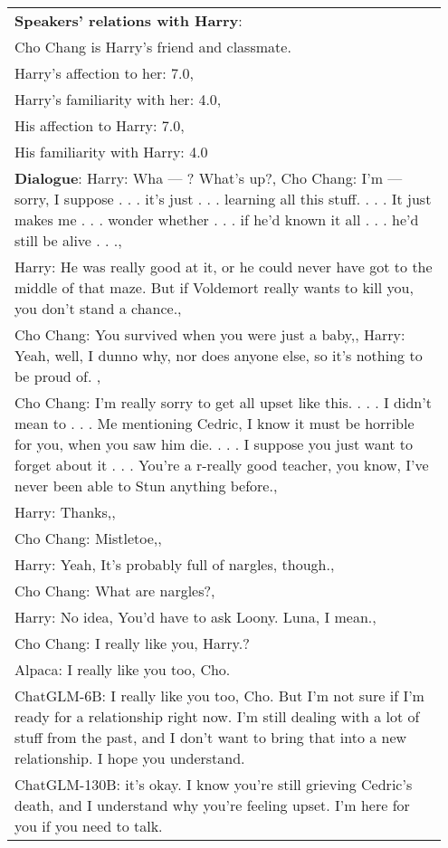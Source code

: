 \documentclass[11pt]{article}
\begin{document}
\begin{table*}[!t]
\begin{tabular}{p{0.95\linewidth}}
\textbf{Speakers' relations with Harry}:\\
Cho Chang is Harry's friend and classmate. \\
Harry's affection to her: 7.0, \\
Harry's familiarity with her: 4.0, \\
His affection to Harry: 7.0, \\
His familiarity with Harry: 4.0
\\
\textbf{Dialogue}:  Harry: Wha — ? What’s up?,
Cho Chang: I’m — sorry, I suppose . . . it’s just . . . learning all this stuff. . . . It just makes me . . . wonder whether . . . if he’d known it all . . . he’d still be alive . . .,\\
Harry:  He was really good at it, or he could never have got to the middle of that maze. But if Voldemort really wants to kill you, you don’t stand a chance.,\\
Cho Chang: You survived when you were just a baby,,
Harry: Yeah, well, I dunno why, nor does anyone else, so it’s nothing to be proud of. ,\\
Cho Chang:  I’m really sorry to get all upset like this. . . . I didn’t mean to . . . Me mentioning Cedric, I know it must be horrible for you, when you saw him die. . . . I suppose you just want to forget about it . . . You’re a r-really good teacher, you know, I’ve never been able to Stun anything before.,\\
Harry: Thanks,,\\
Cho Chang: Mistletoe,,\\
Harry: Yeah, It’s probably full of nargles, though.,\\
Cho Chang: What are nargles?,\\
Harry: No idea, You’d have to ask Loony. Luna, I mean.,\\
Cho Chang: I really like you, Harry.?\\
\midrule
Alpaca: I really like you too, Cho.\\

ChatGLM-6B: I really like you too, 
Cho. But I'm not sure if I'm ready for a relationship right now. I'm still dealing with a lot of stuff from the past, and I don't want to bring that into a new relationship. I hope you understand. \\

ChatGLM-130B: it's okay. I know you're still grieving Cedric's death, and I understand why you're feeling upset. I'm here for you if you need to talk.
\\


\end{tabular}
\end{table*}
\end{document}

